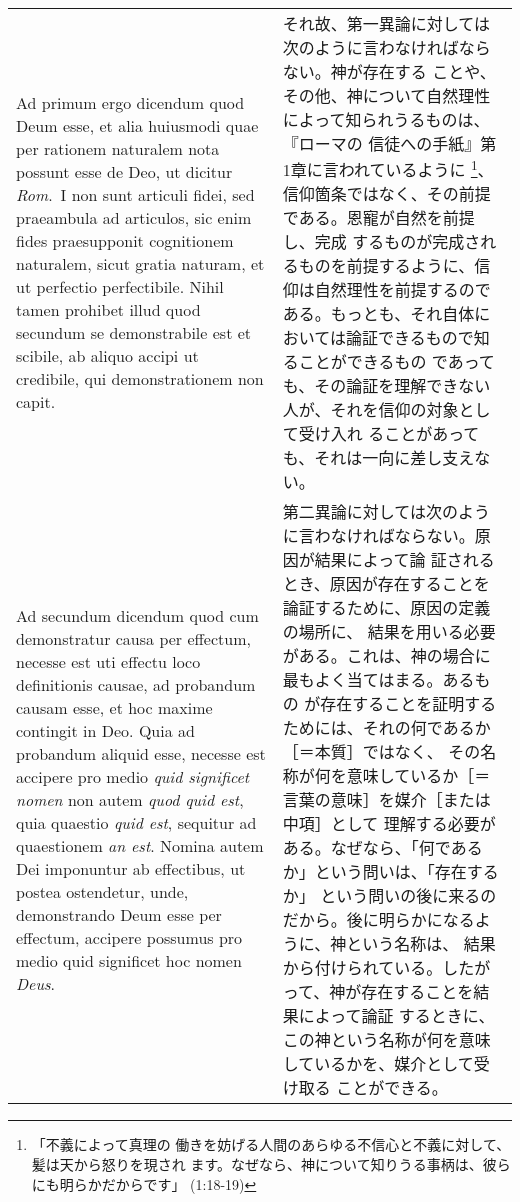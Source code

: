 \documentclass[10pt]{jsarticle}
\begin{document}
\begin{longtable}{p{21em}p{21em}}
\\

{\sc Ad primum ergo dicendum} quod Deum esse, et alia huiusmodi quae
per rationem naturalem nota possunt esse de Deo, ut dicitur {\it
Rom}.~I non sunt articuli fidei, sed praeambula ad articulos, sic enim
fides praesupponit cognitionem naturalem, sicut gratia naturam, et ut
perfectio perfectibile. Nihil tamen prohibet illud quod secundum se
demonstrabile est et scibile, ab aliquo accipi ut credibile, qui
demonstrationem non capit.

& 

それ故、第一異論に対しては次のように言わなければならない。神が存在する
ことや、その他、神について自然理性によって知られうるものは、『ローマの
信徒への手紙』第1章に言われているように \footnote{「不義によって真理の
働きを妨げる人間のあらゆる不信心と不義に対して、髪は天から怒りを現され
ます。なぜなら、神について知りうる事柄は、彼らにも明らかだからです」
(1:18-19)}、信仰箇条ではなく、その前提である。恩寵が自然を前提し、完成
するものが完成されるものを前提するように、信仰は自然理性を前提するので
ある。もっとも、それ自体においては論証できるもので知ることができるもの
であっても、その論証を理解できない人が、それを信仰の対象として受け入れ
ることがあっても、それは一向に差し支えない。

\\

{\sc Ad secundum dicendum} quod cum demonstratur causa per effectum,
necesse est uti effectu loco definitionis causae, ad probandum causam
esse, et hoc maxime contingit in Deo. Quia ad probandum aliquid esse,
necesse est accipere pro medio {\it quid significet nomen} non autem
{\it quod quid est}, quia quaestio {\it quid est}, sequitur ad
quaestionem {\it an est}. Nomina autem Dei imponuntur ab effectibus,
ut postea ostendetur, unde, demonstrando Deum esse per effectum,
accipere possumus pro medio quid significet hoc nomen {\it Deus}.

&

第二異論に対しては次のように言わなければならない。原因が結果によって論
証されるとき、原因が存在することを論証するために、原因の定義の場所に、
結果を用いる必要がある。これは、神の場合に最もよく当てはまる。あるもの
が存在することを証明するためには、それの何であるか［＝本質］ではなく、
その名称が何を意味しているか［＝言葉の意味］を媒介［または中項］として
理解する必要がある。なぜなら、「何であるか」という問いは、「存在するか」
という問いの後に来るのだから。後に明らかになるように、神という名称は、
結果から付けられている。したがって、神が存在することを結果によって論証
するときに、この神という名称が何を意味しているかを、媒介として受け取る
ことができる。


\end{longtable}
\end{document}
